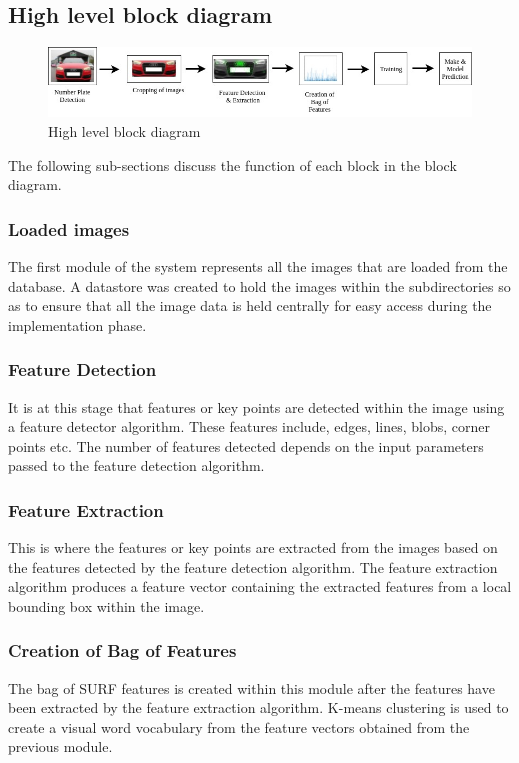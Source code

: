 \documentclass[a4paper, 12pt]{article}
\begin{document}
\subsection{High level block diagram} 

\begin{figure}[!htb] 
  \centering
  \includegraphics[scale=0.5]{VMMR.jpg}
  \caption{High level block diagram} \label{fig:blockdiagram} 
\end{figure}

The following sub-sections discuss the function of each block in the block diagram.

\subsubsection{Loaded images}
The first module of the system represents all the images that are loaded from the database. A datastore was created to hold the images within the subdirectories so as to ensure that all the image data is held centrally for easy access during the implementation phase. 

\subsubsection{Feature Detection}
It is at this stage that features or key points are detected within the image using a feature detector algorithm. These features include, edges, lines, blobs, corner points etc. The number of features detected depends on the input parameters passed to the feature detection algorithm. 

\subsubsection{Feature Extraction}
This is where the features or key points are extracted from the images based on the features detected by the feature detection algorithm. The feature extraction algorithm produces a feature vector containing the extracted features from a local bounding box within the image. 

\subsubsection{Creation of Bag of Features}
The bag of SURF features is created within this module after the features have been extracted by the feature extraction algorithm. K-means clustering is used to create a visual word vocabulary from the feature vectors obtained from the previous module.
\end{document}
